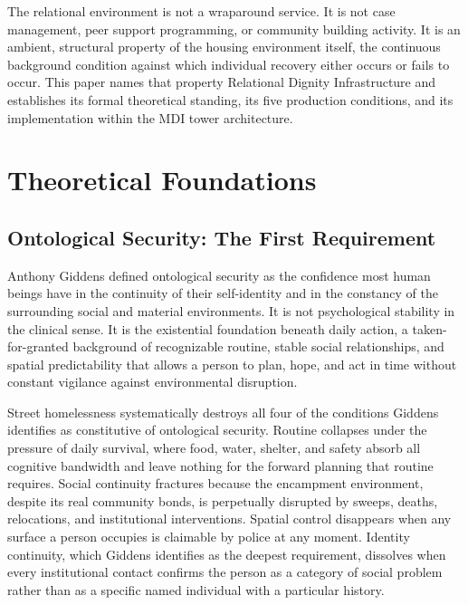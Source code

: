 \documentclass[12pt, letterpaper]{article}
\begin{document}
The relational environment is not a wraparound service. It is not case management, peer support programming, or community building activity. It is an ambient, structural property of the housing environment itself, the continuous background condition against which individual recovery either occurs or fails to occur. This paper names that property Relational Dignity Infrastructure and establishes its formal theoretical standing, its five production conditions, and its implementation within the MDI tower architecture.

\clearpage
\section{Theoretical Foundations}

\subsection{Ontological Security: The First Requirement}

Anthony Giddens defined ontological security as the confidence most human beings have in the continuity of their self-identity and in the constancy of the surrounding social and material environments. It is not psychological stability in the clinical sense. It is the existential foundation beneath daily action, a taken-for-granted background of recognizable routine, stable social relationships, and spatial predictability that allows a person to plan, hope, and act in time without constant vigilance against environmental disruption.

Street homelessness systematically destroys all four of the conditions Giddens identifies as constitutive of ontological security. Routine collapses under the pressure of daily survival, where food, water, shelter, and safety absorb all cognitive bandwidth and leave nothing for the forward planning that routine requires. Social continuity fractures because the encampment environment, despite its real community bonds, is perpetually disrupted by sweeps, deaths, relocations, and institutional interventions. Spatial control disappears when any surface a person occupies is claimable by police at any moment. Identity continuity, which Giddens identifies as the deepest requirement, dissolves when every institutional contact confirms the person as a category of social problem rather than as a specific named individual with a particular history.
\end{document}

